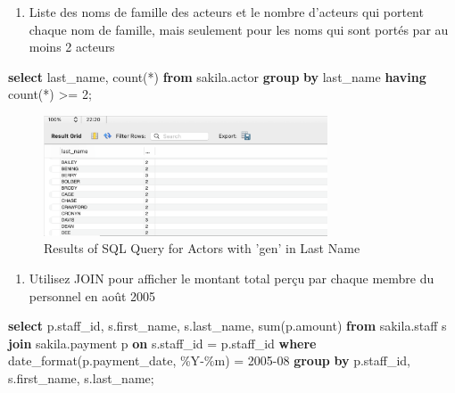 \documentclass[12pt, french]{article}
\providecommand{\tightlist}{%
      \setlength{\itemsep}{0pt}\setlength{\parskip}{0pt}}
\newenvironment{Shaded}{}{}
\newcommand{\KeywordTok}[1]{\textcolor[rgb]{0.00,0.44,0.13}{\textbf{{#1}}}}
\newcommand{\DecValTok}[1]{\textcolor[rgb]{0.25,0.63,0.44}{{#1}}}
\newcommand{\StringTok}[1]{\textcolor[rgb]{0.25,0.44,0.63}{{#1}}}
\newcommand{\FunctionTok}[1]{\textcolor[rgb]{0.02,0.16,0.49}{{#1}}}
\newcommand{\NormalTok}[1]{{#1}}
\newcommand{\OperatorTok}[1]{\textcolor[rgb]{0.40,0.40,0.40}{{#1}}}
\begin{document}
\begin{enumerate}
\def\labelenumi{\arabic{enumi}.}
\setcounter{enumi}{3}
\tightlist
\item
  Liste des noms de famille des acteurs et le nombre d'acteurs qui
  portent chaque nom de famille, mais seulement pour les noms qui sont
  portés par au moins 2 acteurs
\end{enumerate}

\begin{Shaded}
\begin{Highlighting}[]
\KeywordTok{select}\NormalTok{ last\_name, }\FunctionTok{count}\NormalTok{(}\OperatorTok{*}\NormalTok{)}
\KeywordTok{from}\NormalTok{ sakila.actor}
\KeywordTok{group} \KeywordTok{by}\NormalTok{ last\_name }
\KeywordTok{having} \FunctionTok{count}\NormalTok{(}\OperatorTok{*}\NormalTok{) }\OperatorTok{\textgreater{}=} \DecValTok{2}\NormalTok{;}
\end{Highlighting}
\end{Shaded}


\begin{figure}[H] %
    \centering
    \includegraphics[width=0.75\textwidth]{res/Q4.png}
    \caption{Results of SQL Query for Actors with 'gen' in Last Name}
    \label{fig:actors_with_gen}
\end{figure}


\begin{enumerate}
\def\labelenumi{\arabic{enumi}.}
\setcounter{enumi}{4}
\tightlist
\item
  Utilisez JOIN pour afficher le montant total perçu par chaque membre
  du personnel en août 2005
\end{enumerate}

\begin{Shaded}
\begin{Highlighting}[]
\KeywordTok{select}\NormalTok{ p.staff\_id, s.first\_name, s.last\_name, }\FunctionTok{sum}\NormalTok{(p.amount)}
\KeywordTok{from}\NormalTok{ sakila.staff s }\KeywordTok{join}\NormalTok{ sakila.payment p }\KeywordTok{on}\NormalTok{ s.staff\_id }\OperatorTok{=}\NormalTok{ p.staff\_id}
\KeywordTok{where}\NormalTok{ date\_format(p.payment\_date, }\StringTok{\textquotesingle{}\%Y{-}\%m\textquotesingle{}}\NormalTok{) }\OperatorTok{=} \StringTok{\textquotesingle{}2005{-}08\textquotesingle{}}
\KeywordTok{group} \KeywordTok{by}\NormalTok{ p.staff\_id, s.first\_name, s.last\_name;}
\end{Highlighting}
\end{Shaded}
\end{document}
